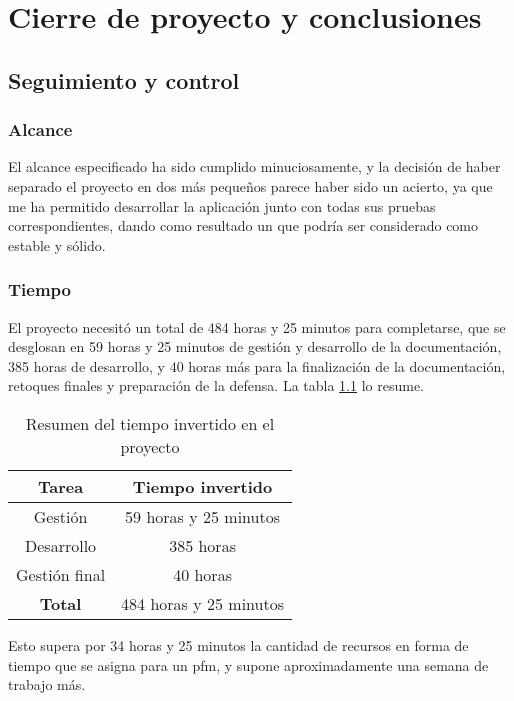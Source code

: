 \chapter{Cierre de proyecto y conclusiones}
\section{Seguimiento y control}
\subsection{Alcance}
El alcance especificado ha sido cumplido minuciosamente, y la decisión de haber
separado el proyecto en dos más pequeños parece haber sido un acierto, ya que
me ha permitido desarrollar la aplicación junto con todas sus pruebas
correspondientes, dando como resultado un  que podría
ser considerado como estable y sólido.

\subsection{Tiempo}
\label{sec:syc:time}
El proyecto necesitó un total de 484 horas y 25 minutos para completarse, que
se desglosan en 59 horas y 25 minutos de gestión y desarrollo de la
documentación, 385 horas de desarrollo, y 40 horas más para la finalización de
la documentación, retoques finales y preparación de la defensa. La tabla
\ref{table:summary} lo resume.

\begin{table}[h]
\centering
\begin{tabular}{c|c}
\multicolumn{1}{c|}{\textbf{Tarea}} & \textbf{Tiempo invertido} \\ \hline
Gestión & 59 horas y 25 minutos \\ \hline
Desarrollo & 385 horas \\ \hline
Gestión final & 40 horas \\ \hline
\multicolumn{1}{c|}{\textbf{Total}} & 484 horas y 25 minutos
\end{tabular}
\caption{Resumen del tiempo invertido en el proyecto \label{table:summary}}
\end{table}

Esto supera por 34 horas y 25 minutos la cantidad de recursos en forma de
tiempo que se asigna para un \gls{pfm}, y supone aproximadamente una semana
de trabajo más.

